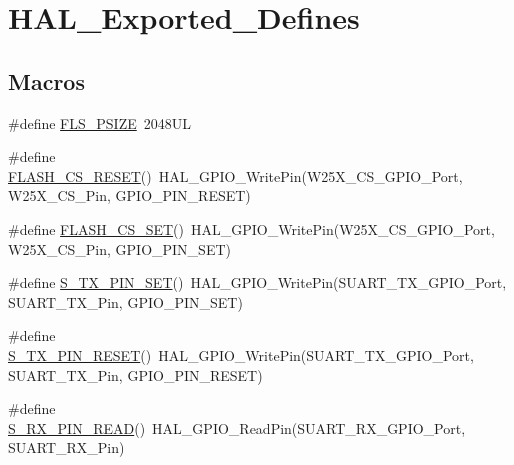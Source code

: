 \hypertarget{group___h_a_l___exported___defines}{}\section{H\+A\+L\+\_\+\+Exported\+\_\+\+Defines}
\label{group___h_a_l___exported___defines}
\subsection*{Macros}
\begin{DoxyCompactItemize}
\item 
\#define \mbox{\hyperlink{group___h_a_l___exported___defines_ga9c64654d333d0c63a47d4610be2509e0}{F\+L\+S\+\_\+\+P\+S\+I\+ZE}}~2048\+UL
\item 
\#define \mbox{\hyperlink{group___h_a_l___exported___defines_ga3df8c78e1d68d69f629630fb6095cec1}{F\+L\+A\+S\+H\+\_\+\+C\+S\+\_\+\+R\+E\+S\+ET}}()~H\+A\+L\+\_\+\+G\+P\+I\+O\+\_\+\+Write\+Pin(W25\+X\+\_\+\+C\+S\+\_\+\+G\+P\+I\+O\+\_\+\+Port, W25\+X\+\_\+\+C\+S\+\_\+\+Pin, G\+P\+I\+O\+\_\+\+P\+I\+N\+\_\+\+R\+E\+S\+ET)
\item 
\#define \mbox{\hyperlink{group___h_a_l___exported___defines_gadc9743a09abcf9e1d203bdd5081db24a}{F\+L\+A\+S\+H\+\_\+\+C\+S\+\_\+\+S\+ET}}()~H\+A\+L\+\_\+\+G\+P\+I\+O\+\_\+\+Write\+Pin(W25\+X\+\_\+\+C\+S\+\_\+\+G\+P\+I\+O\+\_\+\+Port, W25\+X\+\_\+\+C\+S\+\_\+\+Pin, G\+P\+I\+O\+\_\+\+P\+I\+N\+\_\+\+S\+ET)
\item 
\#define \mbox{\hyperlink{group___h_a_l___exported___defines_gac5645a8f806359e621559359dadfc7c5}{S\+\_\+\+T\+X\+\_\+\+P\+I\+N\+\_\+\+S\+ET}}()~H\+A\+L\+\_\+\+G\+P\+I\+O\+\_\+\+Write\+Pin(S\+U\+A\+R\+T\+\_\+\+T\+X\+\_\+\+G\+P\+I\+O\+\_\+\+Port, S\+U\+A\+R\+T\+\_\+\+T\+X\+\_\+\+Pin, G\+P\+I\+O\+\_\+\+P\+I\+N\+\_\+\+S\+ET)
\item 
\#define \mbox{\hyperlink{group___h_a_l___exported___defines_gadd41bc5ddcf6f842928efc4f0d944a57}{S\+\_\+\+T\+X\+\_\+\+P\+I\+N\+\_\+\+R\+E\+S\+ET}}()~H\+A\+L\+\_\+\+G\+P\+I\+O\+\_\+\+Write\+Pin(S\+U\+A\+R\+T\+\_\+\+T\+X\+\_\+\+G\+P\+I\+O\+\_\+\+Port, S\+U\+A\+R\+T\+\_\+\+T\+X\+\_\+\+Pin, G\+P\+I\+O\+\_\+\+P\+I\+N\+\_\+\+R\+E\+S\+ET)
\item 
\#define \mbox{\hyperlink{group___h_a_l___exported___defines_gac1fbe03efbe22feb97f198a4dd8b1237}{S\+\_\+\+R\+X\+\_\+\+P\+I\+N\+\_\+\+R\+E\+AD}}()~H\+A\+L\+\_\+\+G\+P\+I\+O\+\_\+\+Read\+Pin(S\+U\+A\+R\+T\+\_\+\+R\+X\+\_\+\+G\+P\+I\+O\+\_\+\+Port, S\+U\+A\+R\+T\+\_\+\+R\+X\+\_\+\+Pin)
\end{DoxyCompactItemize}


